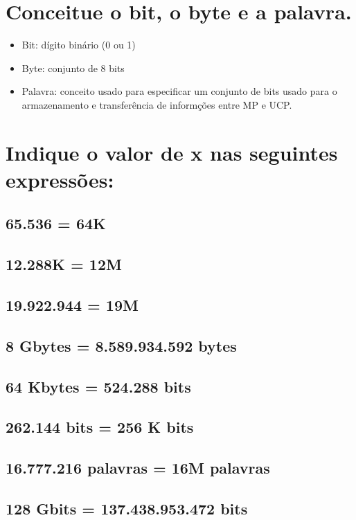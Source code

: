 \documentclass[11pt]{article}
\begin{document}
\section{Conceitue o bit, o byte e a palavra.}
\label{sec:org8ab3a57}
\begin{itemize}
\item Bit: dígito binário (0 ou 1)
\item Byte: conjunto de 8 bits
\item Palavra: conceito usado para especificar um conjunto de bits usado para o
armazenamento e transferência de informções entre MP e UCP.
\end{itemize}
\section{Indique o valor de x nas seguintes expressões:}
\label{sec:orgf6d946b}
\subsection{65.536 = 64K}
\label{sec:orge6912fb}
\subsection{12.288K = 12M}
\label{sec:org8cc839c}
\subsection{19.922.944 = 19M}
\label{sec:orgf5116f2}
\subsection{8 Gbytes = 8.589.934.592 bytes}
\label{sec:org0889a44}
\subsection{64 Kbytes = 524.288 bits}
\label{sec:org55cfa3e}
\subsection{262.144 bits = 256 K bits}
\label{sec:orgf0b29bf}
\subsection{16.777.216 palavras = 16M palavras}
\label{sec:org80725f3}
\subsection{128 Gbits = 137.438.953.472 bits}
\label{sec:orgdd23a5c}
\end{document}
